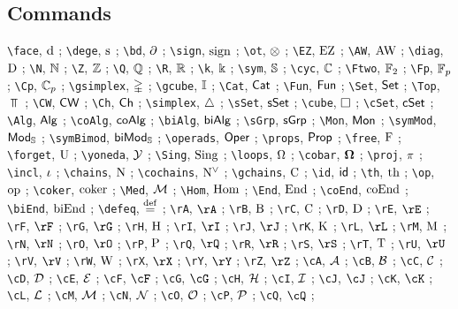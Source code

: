 \subsection*{Commands} 

\verb|\face|, $\operatorname{d}$ ; 
\verb|\dege|, $\operatorname{s}$ ; 
\verb|\bd|, $\operatorname{\partial}$ ; 
\verb|\sign|, $\operatorname{sign}$ ; 
\verb|\ot|, $\otimes$ ; 
\verb|\EZ|, $\operatorname{EZ}$ ; 
\verb|\AW|, $\operatorname{AW}$ ; 
\verb|\diag|, $\mathrm{D}$ ; 
\verb|\N|, $\mathbb{N}$ ; 
\verb|\Z|, $\mathbb{Z}$ ; 
\verb|\Q|, $\mathbb{Q}$ ; 
\verb|\R|, $\mathbb{R}$ ; 
\verb|\k|, $\Bbbk$ ; 
\verb|\sym|, $\mathbb{S}$ ; 
\verb|\cyc|, $\mathbb{C}$ ; 
\verb|\Ftwo|, ${\mathbb{F}_2}$ ; 
\verb|\Fp|, ${\mathbb{F}_p}$ ; 
\verb|\Cp|, ${\mathbb{C}_p}$ ; 
\verb|\gsimplex|, $\mathbb{\Delta}$ ; 
\verb|\gcube|, $\mathbb{I}$ ; 
\verb|\Cat|, $\mathsf{Cat}$ ; 
\verb|\Fun|, $\mathsf{Fun}$ ; 
\verb|\Set|, $\mathsf{Set}$ ; 
\verb|\Top|, $\Top$ ; 
\verb|\CW|, $\mathsf{CW}$ ; 
\verb|\Ch|, $\mathsf{Ch}$ ; 
\verb|\simplex|, $\triangle$ ; 
\verb|\sSet|, $\mathsf{sSet}$ ; 
\verb|\cube|, $\square$ ; 
\verb|\cSet|, $\mathsf{cSet}$ ; 
\verb|\Alg|, $\mathsf{Alg}$ ; 
\verb|\coAlg|, $\mathsf{coAlg}$ ; 
\verb|\biAlg|, $\mathsf{biAlg}$ ; 
\verb|\sGrp|, $\mathsf{sGrp}$ ; 
\verb|\Mon|, $\mathsf{Mon}$ ; 
\verb|\symMod|, $\mathsf{Mod}_{\mathbb{S}}$ ; 
\verb|\symBimod|, $\mathsf{biMod}_{\mathbb{S}}$ ; 
\verb|\operads|, $\mathsf{Oper}$ ; 
\verb|\props|, $\mathsf{Prop}$ ; 
\verb|\free|, $\operatorname{F}$ ; 
\verb|\forget|, $\operatorname{U}$ ; 
\verb|\yoneda|, $\operatorname{\mathcal{Y}}$ ; 
\verb|\Sing|, $\operatorname{Sing}$ ; 
\verb|\loops|, $\Omega$ ; 
\verb|\cobar|, $\operatorname{\mathbf{\Omega}}$ ; 
\verb|\proj|, $\operatorname{\pi}$ ; 
\verb|\incl|, $\operatorname{\iota}$ ; 
\verb|\chains|, $\operatorname{N}$ ; 
\verb|\cochains|, $\operatorname{N^{\vee}}$ ; 
\verb|\gchains|, $\operatorname{C}$ ; 
\verb|\id|, $\mathsf{id}$ ; 
\verb|\th|, $\mathrm{th}$ ; 
\verb|\op|, $\mathrm{op}$ ; 
\verb|\coker|, $\operatorname{coker}$ ; 
\verb|\Med|, $\operatorname{\mathcal{M}}$ ; 
\verb|\Hom|, $\mathrm{Hom}$ ; 
\verb|\End|, $\mathrm{End}$ ; 
\verb|\coEnd|, $\mathrm{coEnd}$ ; 
\verb|\biEnd|, $\mathrm{biEnd}$ ; 
\verb|\defeq|, $\stackrel{\mathrm{def}}{=}$ ; 
\verb|\rA|, $\rA$ ; 
\verb|\rB|, $\mathrm{B}$ ; 
\verb|\rC|, $\mathrm{C}$ ; 
\verb|\rD|, $\mathrm{D}$ ; 
\verb|\rE|, $\rE$ ; 
\verb|\rF|, $\rF$ ; 
\verb|\rG|, $\rG$ ; 
\verb|\rH|, $\mathrm{H}$ ; 
\verb|\rI|, $\rI$ ; 
\verb|\rJ|, $\rJ$ ; 
\verb|\rK|, $\mathrm{K}$ ; 
\verb|\rL|, $\rL$ ; 
\verb|\rM|, $\mathrm{M}$ ; 
\verb|\rN|, $\rN$ ; 
\verb|\rO|, $\rO$ ; 
\verb|\rP|, $\mathrm{P}$ ; 
\verb|\rQ|, $\rQ$ ; 
\verb|\rR|, $\rR$ ; 
\verb|\rS|, $\rS$ ; 
\verb|\rT|, $\mathrm{T}$ ; 
\verb|\rU|, $\rU$ ; 
\verb|\rV|, $\rV$ ; 
\verb|\rW|, $\mathrm{W}$ ; 
\verb|\rX|, $\rX$ ; 
\verb|\rY|, $\rY$ ; 
\verb|\rZ|, $\rZ$ ; 
\verb|\cA|, $\mathcal{A}$ ; 
\verb|\cB|, $\mathcal{B}$ ; 
\verb|\cC|, $\mathcal{C}$ ; 
\verb|\cD|, $\mathcal{D}$ ; 
\verb|\cE|, $\mathcal{E}$ ; 
\verb|\cF|, $\cF$ ; 
\verb|\cG|, $\cG$ ; 
\verb|\cH|, $\mathcal{H}$ ; 
\verb|\cI|, $\mathcal{I}$ ; 
\verb|\cJ|, $\cJ$ ; 
\verb|\cK|, $\cK$ ; 
\verb|\cL|, $\mathcal{L}$ ; 
\verb|\cM|, $\mathcal{M}$ ; 
\verb|\cN|, $\mathcal{N}$ ; 
\verb|\cO|, $\mathcal{O}$ ; 
\verb|\cP|, $\mathcal{P}$ ; 
\verb|\cQ|, $\cQ$ ; 
